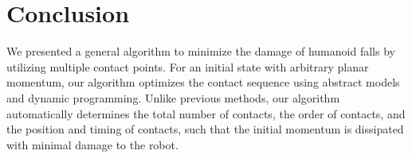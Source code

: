 \section{Conclusion}

We presented a general algorithm to minimize the damage of humanoid
falls by utilizing multiple contact points. For an initial state with
arbitrary planar momentum, our algorithm optimizes the contact
sequence using abstract models and dynamic programming. Unlike
previous methods, our algorithm automatically determines the total
number of contacts, the order of contacts, and the position and timing
of contacts, such that the initial momentum is dissipated with minimal
damage to the robot.


